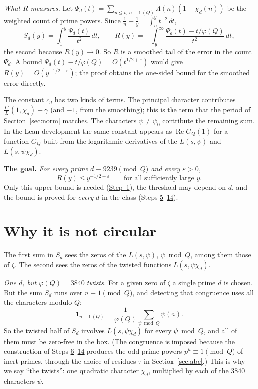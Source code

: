 \documentclass[11pt]{amsart}
\numberwithin{equation}{section}
\theoremstyle{definition}
\theoremstyle{remark}
\newcommand{\re}{\operatorname{Re}}
\begin{document}
\emph{What $R$ measures.} Let $\Psi_d(t)=\sum_{n\le t,\ n\equiv1\,(Q)}\Lambda(n)(1-\chi_d(n))$ be the weighted count of prime powers. Since $\frac1n-\frac1y=\int_n^yt^{-2}\,dt$,
\begin{equation}\label{eq:Rtail}
 S_d(y)=\int_1^y\frac{\Psi_d(t)}{t^2}\,dt,\qquad R(y)=-\int_y^\infty\frac{\Psi_d(t)-t/\varphi(Q)}{t^2}\,dt,
\end{equation}
the second because $R(y)\to0$. So $R$ is a smoothed tail of the error in the count $\Psi_d$. A bound $\Psi_d(t)-t/\varphi(Q)=O(t^{1/2+\varepsilon})$ would give $R(y)=O(y^{-1/2+\varepsilon})$; the proof obtains the one-sided bound for the smoothed error directly.

The constant $c_d$ has two kinds of terms. The principal character contributes $\frac{L'}{L}(1,\chi_d)-\gamma$ (and $-1$, from the smoothing); this is the term that the period of Section~\ref{sec:norm} matches. The characters $\psi\ne\psi_0$ contribute the remaining sum. In the Lean development the same constant appears as $\re G_Q(1)$ for a function $G_Q$ built from the logarithmic derivatives of the $L(s,\psi)$ and $L(s,\psi\chi_d)$.

\medskip
\noindent\textbf{The goal.} \emph{For every prime $d\equiv9239\pmod Q$ and every $\varepsilon>0$,}
\begin{equation}\label{eq:goal}
 R(y)\le y^{-1/2+\varepsilon}\qquad\text{for all sufficiently large }y.
\end{equation}
Only this upper bound is needed (\hyperref[step:1]{Step~1}), the threshold may depend on $d$, and the bound is proved for \emph{every} $d$ in the class (Steps \hyperref[step:5]{5}--\hyperref[step:14]{14}).

\section{Why it is not circular}\label{sec:box}

The first sum in $S_d$ sees the zeros of the $L(s,\psi)$, $\psi\bmod Q$, among them those of $\zeta$. The second sees the zeros of the twisted functions $L(s,\psi\chi_d)$.

\emph{One $d$, but $\varphi(Q)=3840$ twists.} For a given zero of $\zeta$ a single prime $d$ is chosen. But the sum $S_d$ runs over $n\equiv1\pmod Q$, and detecting that congruence uses all the characters modulo $Q$:
\begin{equation}
 \mathbf 1_{n\equiv1\,(Q)}=\frac1{\varphi(Q)}\sum_{\psi\bmod Q}\psi(n).
\end{equation}
So the twisted half of $S_d$ involves $L(s,\psi\chi_d)$ for every $\psi\bmod Q$, and all of them must be zero-free in the box. (The congruence is imposed because the construction of Steps \hyperref[step:6]{6}--\hyperref[step:14]{14} produces the odd prime powers $p^h\equiv1\pmod Q$ of inert primes, through the choice of residues $\tau$ in Section~\ref{sec:abc}.) This is why we say ``the twists'': one quadratic character $\chi_d$, multiplied by each of the $3840$ characters $\psi$.
\end{document}
